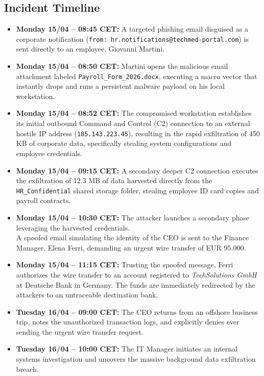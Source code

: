 \subsection{Incident Timeline}

\begin{itemize}
    \item \textbf{Monday 15/04 -- 08:45 CET:} A targeted phishing email disguised as a corporate notification (\texttt{from: hr.notifications@techmed-portal.com}) is sent directly to an employee, Giovanni Martini.
    \item \textbf{Monday 15/04 -- 08:50 CET:} Martini opens the malicious email attachment labeled \texttt{Payroll\_Form\_2026.docx}, executing a macro vector that instantly drops and runs a persistent malware payload on his local workstation.
    \item \textbf{Monday 15/04 -- 08:52 CET:} The compromised workstation establishes its initial outbound Command and Control (C2) connection to an external hostile IP address (\texttt{185.143.223.45}), resulting in the rapid exfiltration of 450 KB of corporate data, specifically stealing system configurations and employee credentials.
    \item \textbf{Monday 15/04 -- 09:15 CET:} A secondary deeper C2 connection executes the exfiltration of 12.3 MB of data harvested directly from the \texttt{HR\_Confidential} shared storage folder, stealing employee ID card copies and payroll contracts.
    \item \textbf{Monday 15/04 -- 10:30 CET:} The attacker launches a secondary phase leveraging the harvested credentials.\\
    A spoofed email simulating the identity of the CEO is sent to the Finance Manager, Elena Ferri, demanding an urgent wire transfer of EUR 95.000.
    \item \textbf{Monday 15/04 -- 11:15 CET:} Trusting the spoofed message, Ferri authorizes the wire transfer to an account registered to \textit{TechSolutions GmbH} at Deutsche Bank in Germany. The funds are immediately redirected by the attackers to an untraceable destination bank.
    \item \textbf{Tuesday 16/04 -- 09:00 CET:} The CEO returns from an offshore business trip, notes the unauthorized transaction logs, and explicitly denies ever sending the urgent wire transfer request.
    \item \textbf{Tuesday 16/04 -- 10:00 CET:} The IT Manager initiates an internal systems investigation and uncovers the massive background data exfiltration breach.

\end{itemize}
